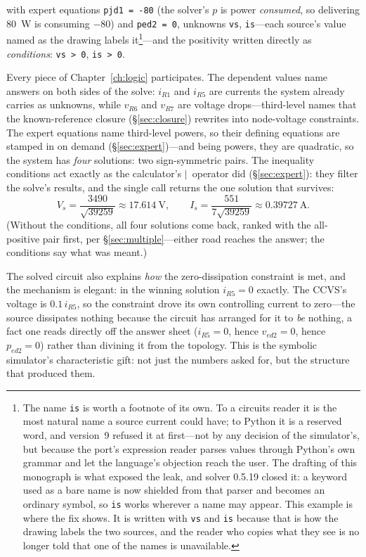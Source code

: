 \documentclass[11pt,oneside]{report}
\newcommand{\code}[1]{\texttt{#1}}
\begin{document}
\noindent with expert equations \code{pjd1 = -80} (the solver's $p$
is power \emph{consumed}, so delivering 80~W is consuming $-80$) and
\code{ped2 = 0},
unknowns \code{vs}, \code{is}---each source's value named as the
drawing labels it\footnote{The name \code{is} is worth a footnote of its
own. To a circuits reader it is the most natural name a source current
could have; to Python it is a reserved word, and version~9 refused it at
first---not by any decision of the simulator's, but because the port's
expression reader parses values through Python's own grammar and let the
language's objection reach the user. The drafting of this monograph is
what exposed the leak, and solver 0.5.19 closed it: a keyword used as a
bare name is now shielded from that parser and becomes an ordinary
symbol, so \code{is} works wherever a name may appear. This example is
where the fix shows. It is written with \code{vs} and \code{is} because
that is how the drawing labels the two sources, and the reader who copies
what they see is no longer told that one of the names is unavailable.}---and the positivity written
directly as \emph{conditions}: \code{vs > 0}, \code{is > 0}.

Every piece of Chapter~\ref{ch:logic} participates. The dependent
values name answers on both sides of the solve: $i_{R1}$ and
$i_{R5}$ are currents the system already carries as unknowns, while
$v_{R6}$ and $v_{R7}$ are voltage drops---third-level names that the
known-reference closure (\S\ref{sec:closure}) rewrites into
node-voltage constraints. The expert equations name third-level
powers, so their
defining equations are stamped in on demand
(\S\ref{sec:expert})---and being powers, they are quadratic, so the
system has \emph{four} solutions: two sign-symmetric pairs. The
inequality conditions act exactly as the calculator's
$\mid$~operator did (\S\ref{sec:expert}): they filter the solve's
results, and the single call returns the one solution that survives:
\[
V_s = \frac{3490}{\sqrt{39259}} \approx 17.614~\mathrm{V},
\qquad
I_s = \frac{551}{7\sqrt{39259}} \approx 0.39727~\mathrm{A}.
\]
(Without the conditions, all four solutions come back, ranked with
the all-positive pair first, per \S\ref{sec:multiple}---either road
reaches the answer; the conditions say what was meant.)

The solved circuit also explains \emph{how} the zero-dissipation
constraint is met, and the mechanism is elegant: in the winning
solution $i_{R5} = 0$ exactly. The CCVS's voltage is $0.1\,i_{R5}$,
so the constraint drove its own controlling current to zero---the
source dissipates nothing because the circuit has arranged for it to
\emph{be} nothing, a fact one reads directly off the answer sheet
($i_{R5} = 0$, hence $v_{ed2} = 0$, hence $p_{ed2} = 0$) rather than
divining it from the topology. This is the symbolic simulator's
characteristic gift: not just the numbers asked for, but the structure
that produced them.
\end{document}
